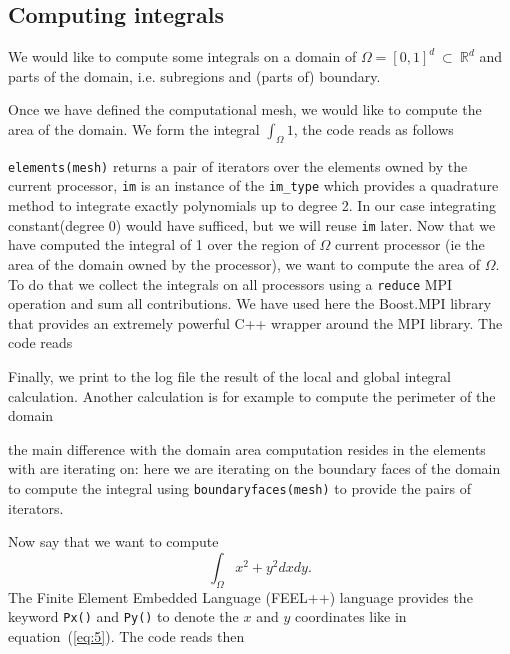 \documentclass[a4paper]{book}
\newcommand{\cpp}{C{\hspace{-.3em}\vspace{-.2em}\tiny++}\xspace}
\begin{document}
\subsection{Computing integrals}
\label{sec:computing-integrals}

We would like to compute some integrals on a domain of $\Omega=[0,1]^d\ \subset\ \mathbb{R}^d$
and parts of the domain, i.e. subregions and (parts of) boundary.

Once we have defined the computational mesh, we would like to compute
the area of the domain. We form the integral $\int_\Omega 1$, the code
reads as follows



\lstinline!elements(mesh)! returns a pair of iterators over the
elements owned by the current processor, \lstinline!im! is an instance
of the \lstinline!im_type! which provides a quadrature method to
integrate exactly polynomials up to degree 2. In our case integrating
constant(degree 0) would have sufficed, but we will reuse
\lstinline!im! later. Now that we have computed the integral of 1 over
the region of $\Omega$ current processor (ie the area of the domain
owned by the processor), we want to compute the area of $\Omega$. To
do that we collect the integrals on all processors using a
\lstinline!reduce! MPI operation and sum all contributions. We have
used here the Boost.MPI library that provides an extremely powerful
\cpp wrapper around the MPI library. The code reads



\noindent
Finally, we print to the log file the result of the local and global
integral calculation. Another calculation is for example to compute
the perimeter of the domain



\noindent
the main difference with the domain area computation resides in the
elements with are iterating on: here we are iterating on the boundary
faces of the domain to compute the integral using
\lstinline!boundaryfaces(mesh)! to provide the pairs of iterators.


Now say that we want to compute
\begin{equation}
  \label{eq:5}
  \int_\Omega x^2 + y^2 dx dy.
\end{equation}
The Finite Element Embedded Language (FEEL++) language provides the
keyword \lstinline!Px()! and \lstinline!Py()! to denote the $x$ and
$y$ coordinates like in equation~(\ref{eq:5}).  The code reads then
\end{document}
